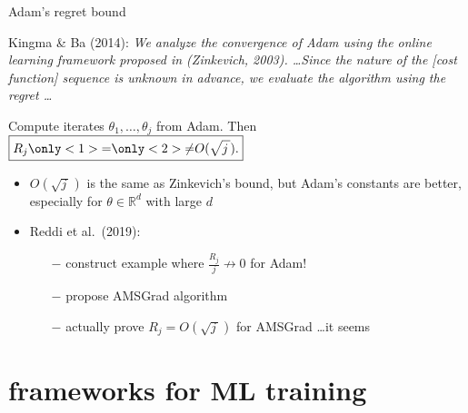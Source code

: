 \documentclass[xcolor={svgnames},
               hyperref={colorlinks,citecolor=DeepPink4,linkcolor=FireBrick,urlcolor=Maroon},
               usepdftitle=false]  %
               {beamer}
\newcommand{\RR}{\mathbb{R}}
\newcommand{\ds}{\displaystyle}
\begin{document}
\begin{frame}{Adam's regret bound}

\noindent Kingma \& Ba (2014):  \emph{We analyze the convergence of Adam using the online learning framework proposed in (Zinkevich, 2003). \dots Since the nature of the [cost function] sequence is unknown in advance, we evaluate the algorithm using the regret \dots}

\medskip
\begin{block}{}
Compute iterates $\theta_1,\dots,\theta_j$ from Adam.  Then $\ds \boxed{R_j \only<1>{=}\only<2>{\ne} O(\sqrt{j\,}).}$
\end{block}

\begin{itemize}
\item $O(\sqrt{j\,})$ is the same as Zinkevich's bound, but Adam's constants are better, especially for $\theta \in \RR^d$ with large $d$
\item<2> Reddi et al.~(2019):
    \begin{itemize}
    \item[$-$] construct example where $\frac{R_j}{j} \nrightarrow 0$ for Adam!
    \item[$-$] propose AMSGrad algorithm
    \item[$-$] actually prove $R_j = O(\sqrt{j\,})$ for AMSGrad \dots it seems
    \end{itemize}
\end{itemize}
\end{frame}


\section{frameworks for ML training}
\end{document}
